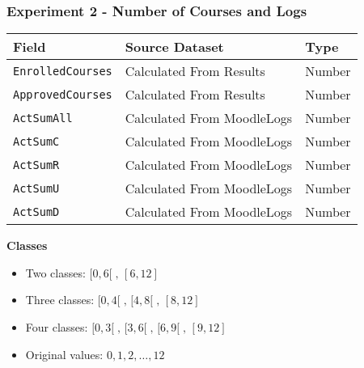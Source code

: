 \begin{frame}
\frametitle{Experiment 2 - Number of Courses and Logs}

{

\small
\centering

\begin{tabular}{| l | l | l |}
    \hline
    \textbf{Field}           & \textbf{Source Dataset}    & \textbf{Type} \\ \hline
    \texttt{EnrolledCourses} & Calculated From Results    & Number        \\ \hline
    \texttt{ApprovedCourses} & Calculated From Results    & Number        \\ \hline
    \texttt{ActSumAll}       & Calculated From MoodleLogs & Number        \\ \hline
    \texttt{ActSumC}         & Calculated From MoodleLogs & Number        \\ \hline
    \texttt{ActSumR}         & Calculated From MoodleLogs & Number        \\ \hline
    \texttt{ActSumU}         & Calculated From MoodleLogs & Number        \\ \hline
    \texttt{ActSumD}         & Calculated From MoodleLogs & Number        \\ \hline
\end{tabular}

}

\vspace{0.5cm}

\textbf{Classes}

\begin{itemize}
    \item Two classes: \; \( [0, 6[\;,\, [6, 12] \)
    \item Three classes: \( [0, 4[\;,\, [4, 8[\;,\, [8, 12] \)
    \item Four classes: \; \( [0, 3[\;,\, [3, 6[\;,\, [6, 9[\;,\, [9, 12] \)
    \item Original values: \( 0, 1, 2, \dots, 12 \)
\end{itemize}

\end{frame}

